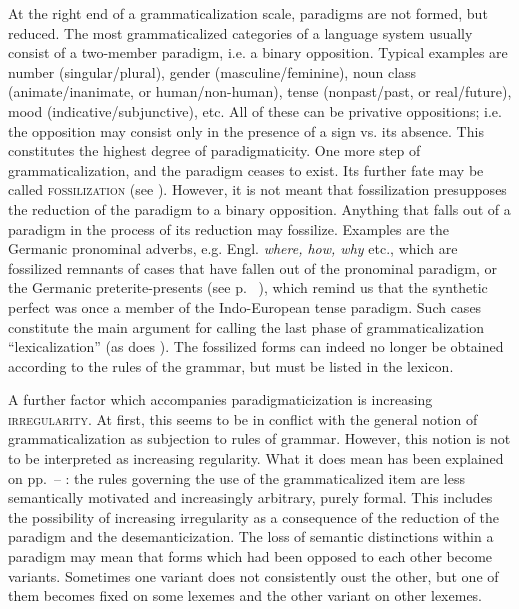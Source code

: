 At the right end of a grammaticalization scale, paradigms are not formed, but reduced. The most grammaticalized categories of a language system usually consist of a two-member paradigm, i.e. a binary opposition. Typical examples are number (singular/plural), gender (masculine/feminine), noun class (animate/inanimate, or human/non-human), tense (nonpast/past, or real/future), mood (indicative/subjunctive), etc. All of these can be privative oppositions; i.e. the opposition may consist only in the presence of a sign vs. its absence. This constitutes the highest degree of paradigmaticity. One more step of grammaticalization, and the paradigm ceases to exist. Its further fate may be called \textsc{fossilization}\label{page147} (see \citealt[35f]{HeineEtAl1984}). However, it is not meant that fossilization presupposes the reduction of the paradigm to a binary opposition. Anything that falls out of a paradigm in the process of its reduction may fossilize. Examples are the Germanic pronominal adverbs, e.g. Engl. \textit{where, how, why} etc., which are fossilized remnants of cases that have fallen out of the pronominal paradigm, or the Germanic preterite-presents (see p.~\pageref{page30}\chk%
), which remind us that the synthetic perfect was once a member of the Indo-European tense paradigm. Such cases constitute the main argument for calling the last phase of grammaticalization ``lexicalization'' (as does \citealt[209]{Givón1979b}). The fossilized forms can indeed no longer be obtained according to the rules of the grammar, but must be listed in the lexicon.

A further factor which accompanies paradigmaticization is increasing \textsc{irregularity}. At first, this seems to be in conflict with the general notion of grammaticalization as subjection to rules of grammar. However, this notion is not to be interpreted as increasing regularity. What it does mean has been explained on pp.~\pageref{page140}--\pageref{page141}\chk%
: the rules governing the use of the grammaticalized item are less semantically motivated and increasingly arbitrary, purely formal. This includes the possibility of increasing irregularity as a consequence of the reduction of the paradigm and the desemanticization. The loss of semantic distinctions within a paradigm may mean that forms which had been opposed to each other become variants. Sometimes one variant does not consistently oust the other, but one of them becomes fixed on some lexemes and the other variant on other lexemes.

